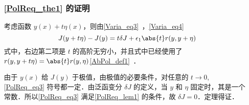  \subsubsection{\autoref{PolReq_the1} 的证明}
考虑函数 $y(x)+t\eta(x)$，则由\autoref{Varia_eq3}~，\autoref{Varia_eq4}~
\begin{equation}\label{PolReq_eq3}
J(y+t\eta)-J(y)=t\delta J+\epsilon_1\abs{t}r(y,y+\eta)
\end{equation}
式中，右边第二项是 $t$ 的高阶无穷小，并且式中已经使用了 $r(y,y+t\eta)=\abs{t}r(y,\eta)$\autoref{AbPol_def1}~．

由于 $y(x)$ 给 $J(y)$ 于极值，由极值的必要条件，对任意的 $t\rightarrow0$, \autoref{PolReq_eq3} 符号都一定．由泛函变分 $\delta J$ 的定义，当 $y$ 和 $\eta$ 固定时，其是一个常数．所以\autoref{PolReq_eq3} 满足\autoref{PolReq_lem1} 的条件，故 $\delta J=0$．定理得证．
